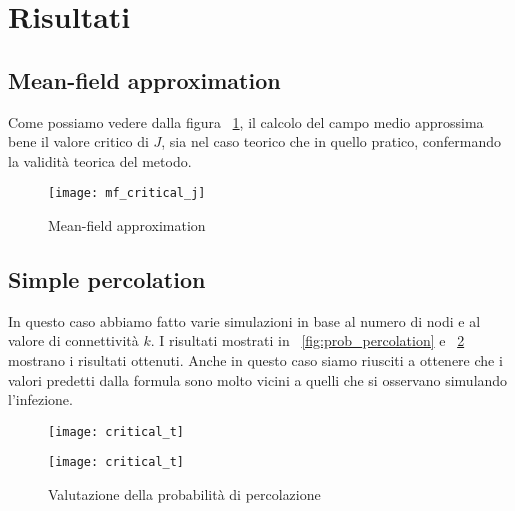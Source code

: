 \section{Risultati}\label{sec:risultati}

\subsection{Mean-field approximation}\label{subsec:res-mean-field-approximation}
    Come possiamo vedere dalla figura ~\ref{fig:mf_critical_j}, il calcolo del campo medio approssima bene il valore
    critico di $J$, sia nel caso teorico che in quello pratico, confermando la validità teorica del metodo.

    \begin{figure}[H]
        \texttt{[image: mf\_critical\_j]}\caption{Mean-field approximation}
        \label{fig:mf_critical_j}
    \end{figure}

\subsection{Simple percolation}\label{subsec:res-simple-percolation}
    In questo caso abbiamo fatto varie simulazioni in base al numero di nodi e al valore di connettività $k$.
    I risultati mostrati in ~\ref{fig:prob_percolation} e ~\ref{fig:prob_percolation_2} mostrano i risultati ottenuti.
    Anche in questo caso siamo riusciti a ottenere che i valori predetti dalla formula sono molto vicini a
    quelli che si osservano simulando l'infezione.

    \begin{figure}[H]
        \begin{minipage}{0.5\textwidth}
            \texttt{[image: critical\_t]}\label{fig:prob_percolation}
        \end{minipage}
        \begin{minipage}{0.5\textwidth}
            \texttt{[image: critical\_t]}\label{fig:prob_percolation_2}
        \end{minipage}
        \caption{Valutazione della probabilità di percolazione}
    \end{figure}

